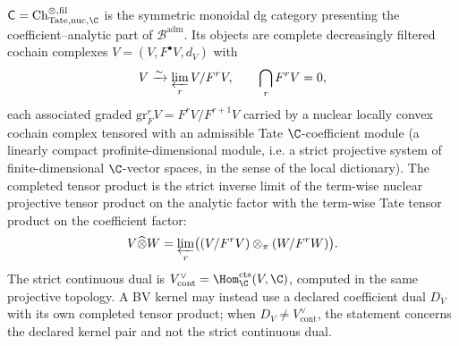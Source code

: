 \begin{defn}
\label{def:completion-host-category}
\(\mathsf C=\mathrm{Ch}^{\otimes,\mathrm{fil}}_{\mathrm{Tate,nuc},\C}\)
is the symmetric monoidal dg category presenting the
coefficient--analytic part of \(\mathcal B^{\mathrm{adm}}\).  Its
objects are complete decreasingly
filtered cochain complexes
\(V=(V,F^\bullet V,d_V)\) with
\[
  V\xrightarrow{\sim}\varprojlim_r V/F^r V,
  \qquad
  \bigcap_r F^r V=0,
\]
each associated graded
\(\mathrm{gr}^r_F V=F^r V/F^{r+1}V\) carried by a nuclear locally
convex cochain complex tensored with an admissible Tate
\(\C\)-coefficient module
(a linearly compact profinite-dimensional module, i.e. a strict
projective system of finite-dimensional \(\C\)-vector spaces, in the
sense of the local dictionary).  The completed tensor product is the strict
inverse limit of the term-wise nuclear projective tensor product on
the analytic factor with the term-wise Tate tensor product on the
coefficient factor:
\[
  V\widehat\otimes W
  =\varprojlim_r\bigl((V/F^rV)\otimes_\pi(W/F^rW)\bigr).
\]
The strict continuous dual is
\(V^\vee_{\mathrm{cont}}=\Hom^{\mathrm{cts}}_\C(V,\C)\), computed in
the same projective topology.  A BV kernel may instead use a declared
coefficient dual \(D_V\) with its own completed tensor product; when
\(D_V\ne V^\vee_{\mathrm{cont}}\), the statement concerns the declared
kernel pair and not the strict continuous dual.
\end{defn}

